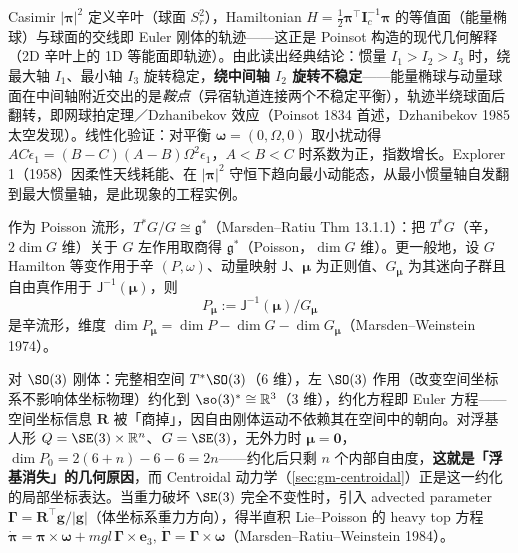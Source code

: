 \begin{insight}
Casimir $|\boldsymbol\pi|^2$ 定义辛叶（球面 $S^2_r$），Hamiltonian $H=\tfrac12\boldsymbol\pi^\top\mathbf I_c^{-1}\boldsymbol\pi$ 的等值面（能量椭球）与球面的交线即 Euler 刚体的轨迹——这正是 Poinsot 构造的现代几何解释（2D 辛叶上的 1D 等能面即轨迹）。由此读出经典结论：惯量 $I_1>I_2>I_3$ 时，绕最大轴 $I_1$、最小轴 $I_3$ 旋转稳定，\textbf{绕中间轴 $I_2$ 旋转不稳定}——能量椭球与动量球面在中间轴附近交出的是\emph{鞍点}（异宿轨道连接两个不稳定平衡），轨迹半绕球面后翻转，即网球拍定理／Dzhanibekov 效应（Poinsot 1834 首述，Dzhanibekov 1985 太空发现）。线性化验证：对平衡 $\boldsymbol\omega=(0,\Omega,0)$ 取小扰动得 $A C\ddot\epsilon_1=(B-C)(A-B)\Omega^2\epsilon_1$，$A<B<C$ 时系数为正，指数增长。Explorer 1（1958）因柔性天线耗能、在 $|\boldsymbol\pi|^2$ 守恒下趋向最小动能态，从最小惯量轴自发翻到最大惯量轴，是此现象的工程实例。
\end{insight}

\begin{theorem}\label{thm:gm-reduction}
作为 Poisson 流形，$T^*G/G\cong\mathfrak g^*$（Marsden--Ratiu Thm 13.1.1）：把 $T^*G$（辛，$2\dim G$ 维）关于 $G$ 左作用取商得 $\mathfrak g^*$（Poisson，$\dim G$ 维）。更一般地，设 $G$ Hamilton 等变作用于辛 $(P,\omega)$、动量映射 $\mathsf J$、$\boldsymbol\mu$ 为正则值、$G_{\boldsymbol\mu}$ 为其迷向子群且自由真作用于 $\mathsf J^{-1}(\boldsymbol\mu)$，则
\begin{equation}
  P_{\boldsymbol\mu}:=\mathsf J^{-1}(\boldsymbol\mu)/G_{\boldsymbol\mu}
  \label{eq:gm-marsden-weinstein}
\end{equation}
是辛流形，维度 $\dim P_{\boldsymbol\mu}=\dim P-\dim G-\dim G_{\boldsymbol\mu}$（Marsden--Weinstein 1974\cite{marsden1974reduction}）。
\end{theorem}

\begin{insight}
对 $\SO(3)$ 刚体：完整相空间 $T^*\SO(3)$（6 维），左 $\SO(3)$ 作用（改变空间坐标系不影响体坐标物理）约化到 $\so(3)^*\cong\mathbb R^3$（3 维），约化方程即 Euler 方程——空间坐标信息 $\mathbf R$ 被「商掉」，因自由刚体运动不依赖其在空间中的朝向。对浮基人形 $Q=\SE(3)\times\mathbb R^n$、$G=\SE(3)$，无外力时 $\boldsymbol\mu=\mathbf0$，$\dim P_0=2(6+n)-6-6=2n$——约化后只剩 $n$ 个内部自由度，\textbf{这就是「浮基消失」的几何原因}，而 Centroidal 动力学（\cref{sec:gm-centroidal}）正是这一约化的局部坐标表达。当重力破坏 $\SE(3)$ 完全不变性时，引入 advected parameter $\boldsymbol\Gamma=\mathbf R^\top\mathbf g/|\mathbf g|$（体坐标系重力方向），得半直积 Lie--Poisson 的 heavy top 方程 $\dot{\boldsymbol\pi}=\boldsymbol\pi\times\boldsymbol\omega+mgl\,\boldsymbol\Gamma\times\mathbf e_3,\,\dot{\boldsymbol\Gamma}=\boldsymbol\Gamma\times\boldsymbol\omega$（Marsden--Ratiu--Weinstein 1984\cite{marsden1984semidirect}）。
\end{insight}

